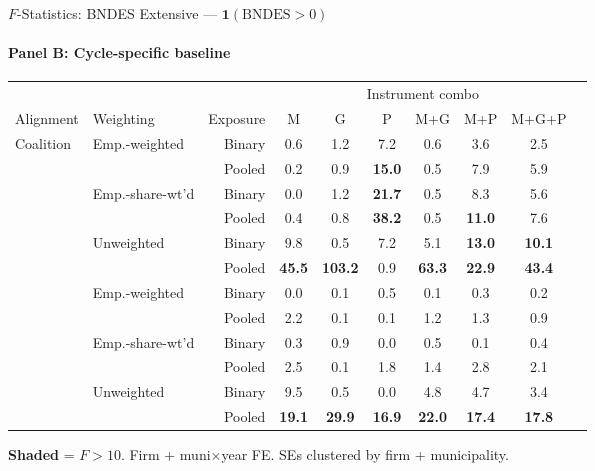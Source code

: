 \documentclass[aspectratio=169,10pt]{beamer}
\newcommand{\fpass}[1]{\cellcolor{pass}\textbf{#1}}
\begin{document}
\begin{frame}[t]{$F$-Statistics: BNDES Extensive --- $\mathbf{1}(\text{BNDES}>0)$}
\framesubtitle{Panel B: Cycle-specific baseline}
\begin{center}
\footnotesize
\setlength{\tabcolsep}{3.5pt}
\renewcommand{\arraystretch}{1.05}
\begin{tabular}{@{}llrccccccc@{}}
\toprule
 & & & \multicolumn{6}{c}{Instrument combo} \\
\cmidrule(l{2pt}r{2pt}){4-9}
Alignment & Weighting & Exposure & M & G & P & M+G & M+P & M+G+P \\
\midrule
  \multirow{6}{*}{Coalition} & \multirow{2}{*}{Emp.-weighted} & Binary & 0.6 & 1.2 & 7.2 & 0.6 & 3.6 & 2.5 \\
   &  & Pooled & 0.2 & 0.9 & \fpass{15.0} & 0.5 & 7.9 & 5.9 \\
   & \multirow{2}{*}{Emp.-share-wt'd} & Binary & 0.0 & 1.2 & \fpass{21.7} & 0.5 & 8.3 & 5.6 \\
   &  & Pooled & 0.4 & 0.8 & \fpass{38.2} & 0.5 & \fpass{11.0} & 7.6 \\
   & \multirow{2}{*}{Unweighted} & Binary & 9.8 & 0.5 & 7.2 & 5.1 & \fpass{13.0} & \fpass{10.1} \\
   &  & Pooled & \fpass{45.5} & \fpass{103.2} & 0.9 & \fpass{63.3} & \fpass{22.9} & \fpass{43.4} \\
\addlinespace[5pt]
  \multirow{6}{*}{Party} & \multirow{2}{*}{Emp.-weighted} & Binary & 0.0 & 0.1 & 0.5 & 0.1 & 0.3 & 0.2 \\
   &  & Pooled & 2.2 & 0.1 & 0.1 & 1.2 & 1.3 & 0.9 \\
   & \multirow{2}{*}{Emp.-share-wt'd} & Binary & 0.3 & 0.9 & 0.0 & 0.5 & 0.1 & 0.4 \\
   &  & Pooled & 2.5 & 0.1 & 1.8 & 1.4 & 2.8 & 2.1 \\
   & \multirow{2}{*}{Unweighted} & Binary & 9.5 & 0.5 & 0.0 & 4.8 & 4.7 & 3.4 \\
   &  & Pooled & \fpass{19.1} & \fpass{29.9} & \fpass{16.9} & \fpass{22.0} & \fpass{17.4} & \fpass{17.8} \\
\bottomrule
\end{tabular}
\end{center}
{\scriptsize \colorbox{pass}{\textbf{Shaded}} = $F>10$. Firm + muni$\times$year FE. SEs clustered by firm + municipality.}
\end{frame}
\end{document}
